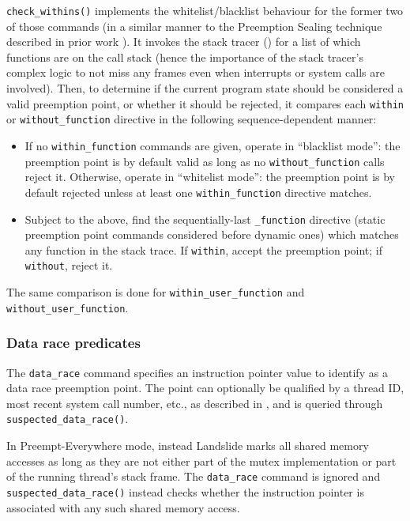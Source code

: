 {\tt check\_withins()} implements the whitelist/blacklist behaviour for the former two of those commands
(in a similar manner to the Preemption Sealing technique described in prior work \cite{sealing}).
It invokes the stack tracer (\sect{\ref{sec:landslide-stacktrace}})
for a list of which functions are on the call stack
(hence the importance of the stack tracer's complex logic to not miss any frames
even when interrupts or system calls are involved).
Then, to determine if the current program state should be considered a valid preemption point,
or whether it should be rejected,
it compares each {\tt within} or {\tt without\_function} directive in the following sequence-dependent manner:

\begin{itemize}
	\item If no {\tt within\_function} commands are given, operate in ``blacklist mode'':
		the preemption point is by default valid as long as no {\tt without\_function} calls reject it.
		Otherwise, operate in ``whitelist mode'':
		the preemption point is by default rejected unless at least one {\tt within\_function} directive matches.
	\item Subject to the above, find the sequentially-last {\tt *\_function} directive
		(static preemption point commands considered before dynamic ones)
		which matches any function in the stack trace.
		If {\tt within}, accept the preemption point; if {\tt without}, reject it.
\end{itemize}

The same comparison is done for {\tt within\_user\_function} and {\tt without\_user\_function}.

\subsubsection{Data race predicates}

The {\tt data\_race} command specifies an instruction pointer value to identify as a data race preemption point.
The point can optionally be qualified by a thread ID, most recent system call number, etc.,
as described in \sect{\ref{sec:landslide-dynamicconfig}},
and is queried through {\tt suspected\_data\_race()}.

In Preempt-Everywhere mode, instead Landslide marks all shared memory accesses
as long as they are not either part of the mutex implementation or part of the running thread's stack frame.
The {\tt data\_race} command is ignored and {\tt suspected\_data\_race()}
instead checks whether the instruction pointer is associated with any such shared memory access.

